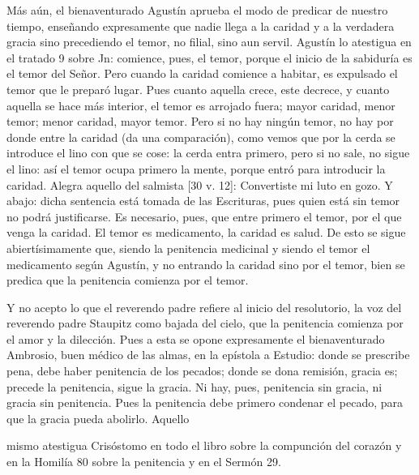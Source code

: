 Más aún, el bienaventurado Agustín aprueba el modo de predicar de nuestro tiempo, enseñando expresamente que nadie llega a la caridad y a la verdadera gracia sino precediendo el temor, no filial, sino aun servil. Agustín lo atestigua en el tratado 9 sobre Jn: comience, pues, el temor, porque el inicio de la sabiduría es el temor del Señor. Pero cuando la caridad comience a habitar, es expulsado el temor que le preparó lugar. Pues cuanto aquella crece, este decrece, y cuanto aquella se hace más interior, el temor es arrojado fuera; mayor caridad, menor temor; menor caridad, mayor temor. Pero si no hay ningún temor, no hay por donde entre la caridad (da una comparación), como vemos que por la cerda se introduce el lino con que se cose: la cerda entra primero, pero si no sale, no sigue el lino: así el temor ocupa primero la mente, porque entró para introducir la caridad. Alegra aquello del salmista [30 v. 12]: Convertiste mi luto en gozo. Y abajo: dicha sentencia está tomada de las Escrituras, pues quien está sin temor no podrá justificarse. Es necesario, pues, que entre primero el temor, por el que venga la caridad. El temor es medicamento, la caridad es salud. De esto se sigue abiertísimamente que, siendo la penitencia medicinal y siendo el temor el medicamento según Agustín, y no entrando la caridad sino por el temor, bien se predica que la penitencia comienza por el temor.

Y no acepto lo que el reverendo padre refiere al inicio del resolutorio, la voz del reverendo padre Staupitz como bajada del cielo, que la penitencia comienza por el amor y la dilección. Pues a esta se opone expresamente el bienaventurado Ambrosio, buen médico de las almas, en la epístola a Estudio: donde se prescribe pena, debe haber penitencia de los pecados; donde se dona remisión, gracia es; precede la penitencia, sigue la gracia. Ni hay, pues, penitencia sin gracia, ni gracia sin penitencia. Pues la penitencia debe primero condenar el pecado, para que la gracia pueda abolirlo. Aquello

mismo atestigua Crisóstomo en todo el libro sobre la compunción del corazón y en la Homilía 80 sobre la penitencia y en el Sermón 29.

